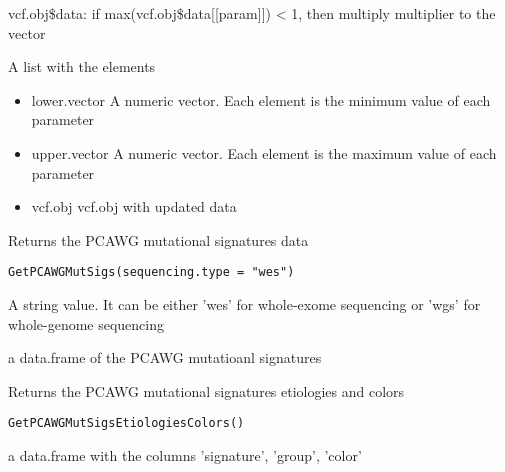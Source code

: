 \documentclass[letterpaper]{book}
\begin{document}
%
\begin{Details}\relax
vcf.obj\$data: if max(vcf.obj\$data[[param]]) < 1, then multiply multiplier to the vector
\end{Details}
%
\begin{Value}
A list with the elements
\begin{itemize}

\item{} lower.vector A numeric vector. Each element is the minimum value of each parameter
\item{} upper.vector A numeric vector. Each element is the maximum value of each parameter
\item{} vcf.obj vcf.obj with updated data

\end{itemize}

\end{Value}
%
\begin{Description}\relax
Returns the PCAWG mutational signatures data
\end{Description}
%
\begin{Usage}
\begin{verbatim}
GetPCAWGMutSigs(sequencing.type = "wes")
\end{verbatim}
\end{Usage}
%
\begin{Arguments}
\begin{ldescription}
\item[\code{sequencing.type}] A string value.
It can be either 'wes' for whole-exome sequencing or 'wgs' for whole-genome sequencing
\end{ldescription}
\end{Arguments}
%
\begin{Value}
a data.frame of the PCAWG mutatioanl signatures
\end{Value}
%
\begin{Description}\relax
Returns the PCAWG mutational signatures etiologies and colors
\end{Description}
%
\begin{Usage}
\begin{verbatim}
GetPCAWGMutSigsEtiologiesColors()
\end{verbatim}
\end{Usage}
%
\begin{Value}
a data.frame with the columns 'signature', 'group', 'color'
\end{Value}
\end{document}
